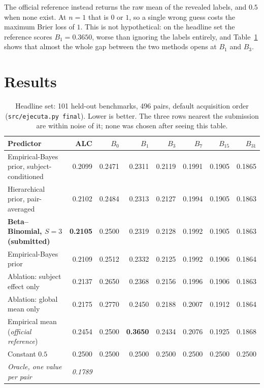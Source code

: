 \documentclass{article}
\begin{document}
The official reference instead returns the raw mean of the revealed labels, and
$0.5$ when none exist. At $n=1$ that is $0$ or $1$, so a single wrong guess costs
the maximum Brier loss of $1$. This is not hypothetical: on the headline set the
reference scores $B_1 = 0.3650$, worse than ignoring the labels entirely, and
Table~\ref{tab:main} shows that almost the whole gap between the two methods
opens at $B_1$ and $B_3$.

\section{Results}

\begin{table}[t]
\centering
\caption{Headline set: 101 held-out benchmarks, 496 pairs, default acquisition
order (\texttt{src/ejecuta.py final}). Lower is better. The three rows nearest
the submission are within noise of it; none was chosen after seeing this table.}
\label{tab:main}
\small
\begin{tabular}{lrrrrrrr}
\toprule
Predictor & ALC & $B_0$ & $B_1$ & $B_3$ & $B_7$ & $B_{15}$ & $B_{31}$ \\
\midrule
Empirical-Bayes prior, subject-conditioned & 0.2099 & 0.2471 & 0.2311 & 0.2119 & 0.1991 & 0.1905 & 0.1865 \\
Hierarchical prior, pair-averaged          & 0.2102 & 0.2484 & 0.2313 & 0.2127 & 0.1994 & 0.1905 & 0.1863 \\
\textbf{Beta--Binomial, $S{=}3$ (submitted)} & \textbf{0.2105} & 0.2500 & 0.2319 & 0.2128 & 0.1992 & 0.1905 & 0.1863 \\
Empirical-Bayes prior                      & 0.2109 & 0.2512 & 0.2332 & 0.2125 & 0.1992 & 0.1906 & 0.1864 \\
Ablation: subject effect only              & 0.2137 & 0.2650 & 0.2368 & 0.2156 & 0.1996 & 0.1906 & 0.1863 \\
Ablation: global mean only                 & 0.2175 & 0.2770 & 0.2450 & 0.2188 & 0.2007 & 0.1912 & 0.1864 \\
Empirical mean (\emph{official reference}) & 0.2454 & 0.2500 & \textbf{0.3650} & 0.2434 & 0.2076 & 0.1925 & 0.1868 \\
Constant $0.5$                             & 0.2500 & 0.2500 & 0.2500 & 0.2500 & 0.2500 & 0.2500 & 0.2500 \\
\midrule
\emph{Oracle, one value per pair}          & \emph{0.1789} & & & & & & \\
\bottomrule
\end{tabular}
\end{table}
\end{document}
